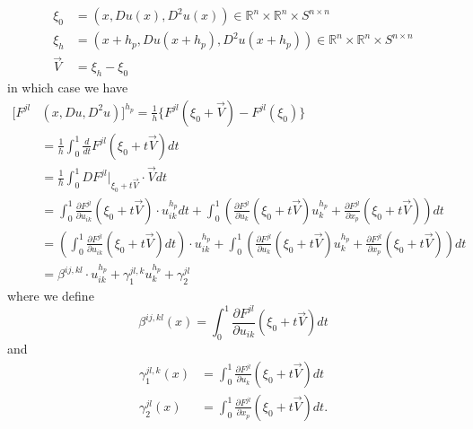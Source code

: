 \documentclass[12pt,leqno]{amsart}%
\providecommand{\U}[1]{\protect\rule{.1in}{.1in}}
\theoremstyle{plain}
\numberwithin{equation}{section}
\theoremstyle{definition}
\begin{document}
\begin{align*}
\xi_{0}  &  =\left(  x,Du(x),D^{2}u(x)\right)  \in%
\mathbb{R}
^{n}\times%
\mathbb{R}
^{n}\times S^{n\times n}\\
\xi_{h}  &  =\left(  x+h_{p},Du(x+h_{p}),D^{2}u(x+h_{p})\right)  \in%
\mathbb{R}
^{n}\times%
\mathbb{R}
^{n}\times S^{n\times n}\\
\vec{V}  &  =\xi_{h}-\xi_{0}%
\end{align*}
in which case we have%
\begin{align*}
\lbrack F^{jl}  &  (x,Du,D^{2}u)]^{h_{p}}=\frac{1}{h}\{F^{jl}(\xi_{0}+\vec
{V})-F^{jl}(\xi_{0})\}\\
&  =\frac{1}{h}\int_{0}^{1}\frac{d}{dt}F^{jl}(\xi_{0}+t\vec{V})dt\\
&  =\frac{1}{h}\int_{0}^{1}DF^{jl}|_{\xi_{0}+t\vec{V}}\cdot\vec{V}dt\\
&  =\int_{0}^{1}\frac{\partial F^{jl}}{\partial u_{ik}}({\xi_{0}+t\vec{V}%
})\cdot u_{ik}^{h_{p}}dt+\int_{0}^{1}\left(  \frac{\partial F^{jl}}{\partial
u_{k}}({\xi_{0}+t\vec{V}})u_{k}^{h_{p}}+\frac{\partial F^{jl}}{\partial x_{p}%
}(\xi_{0}+t\vec{V})\right)  dt\\
&  =\left(  \int_{0}^{1}\frac{\partial F^{jl}}{\partial u_{ik}}({\xi_{0}%
+t\vec{V}})dt\right)  \cdot u_{ik}^{h_{p}}+\int_{0}^{1}\left(  \frac{\partial
F^{jl}}{\partial u_{k}}({\xi_{0}+t\vec{V}})u_{k}^{h_{p}}+\frac{\partial
F^{jl}}{\partial x_{p}}(\xi_{0}+t\vec{V})\right)  dt\\
&  =\beta^{ij,kl}\cdot u_{ik}^{h_{p}}+\gamma_{1}^{jl,k}u_{k}^{h_{p}}%
+\gamma_{2}^{jl}%
\end{align*}
where we define
\begin{equation}
\beta^{ij,kl}(x)=\int_{0}^{1}\frac{\partial F^{jl}}{\partial u_{ik}}(\xi
_{0}+t\vec{V})dt \label{bterm}%
\end{equation}
and
\begin{align}
\gamma_{1}^{jl,k}(x)  &  =\int_{0}^{1}\frac{\partial F^{jl}}{\partial u_{k}%
}({\xi_{0}+t\vec{V}})dt\label{gamma1}\\
\gamma_{2}^{jl}(x)  &  =\int_{0}^{1}\frac{\partial F^{jl}}{\partial x_{p}}%
(\xi_{0}+t\vec{V})dt. \label{gamma2}%
\end{align}
\end{document}
